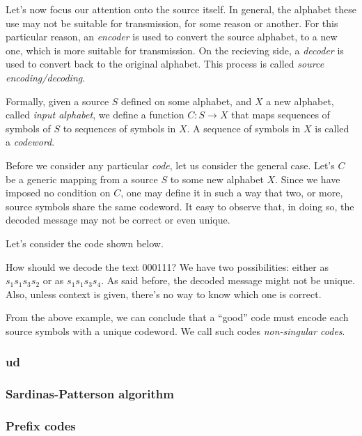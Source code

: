 \documentclass{subfiles}
\begin{document}
    Let's now focus our attention onto the source itself.
    In general, the alphabet these use may not be suitable for transmission,
        for some reason or another. For this particular reason, 
        an \emph{encoder} is used to convert the source alphabet,
        to a new one, which is more suitable for transmission.
        On the recieving side, 
        a \emph{decoder} is used to convert back to the original alphabet.
        This process is called \emph{source encoding/decoding}.

    Formally, given a source \(S\) defined on some alphabet, 
        and \(X\) a new alphabet, called \emph{input alphabet}, 
        we define a function \(C : S \to X\) that maps sequences of symbols of \(S\)
        to sequences of symbols in \(X\). 
        A sequence of symbols in \(X\) is called a \emph{codeword}.

    Before we consider any particular \emph{code},
        let us consider the general case. 
        Let's \(C\) be a generic mapping from a source \(S\) to some new alphabet \(X\).
        Since we have imposed no condition on \(C\), 
        one may define it in such a way that two, or more,
        source symbols share the same codeword.
        It easy to observe that, in doing so,
        the decoded message may not be correct or even unique.

    \begin{example*}
        Let's consider the code shown below.
        
        How should we decode the text 000111? 
            We have two possibilities: 
                either as \(s_{1}s_{1}s_{3}s_{2}\) or as \(s_{1}s_{1}s_{3}s_{4}\).
        As said before, the decoded message might not be unique. 
        Also, unless context is given, there's no way to know which one is correct.
    \end{example*}

    From the above example, we can conclude that a ``good'' code must encode each 
    source symbols with a unique codeword. 
    We call such codes \emph{non-singular codes}.
  
    \subsubsection{\Gls{ud}}\label{Sec:1.2.1}
    

    \subsubsection{Sardinas-Patterson algorithm}
    

    \subsubsection{Prefix codes}
    
\end{document}

